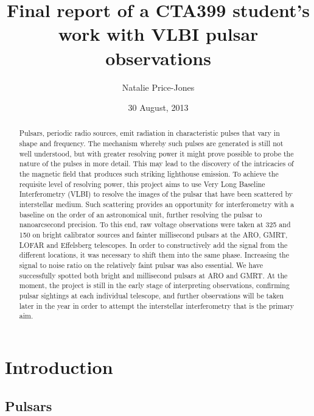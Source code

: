 \documentclass[a4paper,12pt]{article}
\begin{document}
\onehalfspacing
\title{Final report of a CTA399 student's work with VLBI pulsar observations}
\author{Natalie Price-Jones}
\date{30 August, 2013}
\maketitle

\begin{abstract}
\label{abstract}


Pulsars, periodic radio sources, emit radiation in characteristic pulses that vary in shape and frequency. The mechanism whereby such pulses are generated is still not well understood, but with greater resolving power it might prove possible to probe the nature of the pulses in more detail. This may lead to the discovery of the intricacies of the magnetic field that produces such striking lighthouse emission. To achieve the requisite level of resolving power, this project aims to use Very Long Baseline Interferometry (VLBI) to resolve the images of the pulsar that have been scattered by interstellar medium. Such scattering provides an opportunity for interferometry with a baseline on the order of an astronomical unit, further resolving the pulsar to nanoarcsecond precision. To this end, raw voltage observations were taken at \unit{325}{\mega\hertz} and \unit{150}{\mega\hertz} on bright calibrator sources and fainter millisecond pulsars at the ARO, GMRT, LOFAR and Effelsberg telescopes.  In order to constructively add the signal from the different locations, it was necessary to shift them into the same phase. Increasing the signal to noise ratio on the relatively faint pulsar was also essential. We have successfully spotted both bright and millisecond pulsars at ARO and GMRT. At the moment, the project is still in the early stage of interpreting observations, confirming pulsar sightings at each individual telescope, and further observations will be taken later in the year in order to attempt the interstellar interferometry that is the primary aim. 

\end{abstract}

\section{Introduction}
\label{sec:introduction}

\subsection{Pulsars}
\label{sec:pulsars}
\end{document}

